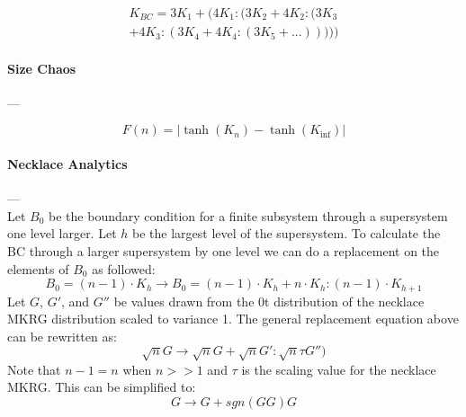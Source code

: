 \documentclass[twocolumn,aps,showpacs,superscriptaddress,prl]{revtex4}
\begin{document}

\begin{equation}
\begin{split}
K_{BC} = 3K_1 + (4K_1:(3K_2 + 4K_2:(3K_3 \\
+ 4K_3:(3K_4 + 4K_4:(3K_5+ ...)))))
\end{split}
\label{eq:bc}
\end{equation}


\paragraph*{Size Chaos} ---

\begin{equation}
F(n) = | \tanh(K_n) - \tanh(K_{\inf}) |
\label{eq:cor}
\end{equation}


\paragraph*{Necklace Analytics} ---\\
Let $B_0$ be the boundary condition for a finite subsystem through a supersystem one level larger. Let $h$ be the largest level of the supersystem. To calculate the BC through a larger supersystem by one level we can do a replacement on the elements of $B_0$ as followed:
\begin{equation}
B_0 = (n-1)\cdot K_{h} \rightarrow B_0 = (n-1)\cdot K_h + n \cdot K_h:(n-1)\cdot K_{h+1}
\end{equation}
Let $G$, $G'$, and $G''$ be values drawn from the 0t distribution of the necklace MKRG distribution scaled to variance 1. The general replacement equation above can be rewritten as:
\begin{equation}
\sqrt{n} G \rightarrow \sqrt{n} G + \sqrt{n} G': \sqrt{n} \tau G'')
\end{equation}
Note that $n-1=n$ when $n>>1$ and $\tau$ is the scaling value for the necklace MKRG. This can be simplified to:
\begin{equation}
G \rightarrow G + sgn(G G)G
\end{equation}
\end{document}

